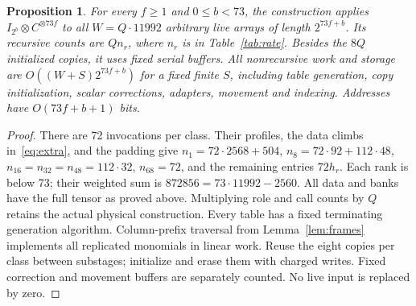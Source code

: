 \documentclass[11pt]{amsart}
\newtheorem{proposition}[theorem]{Proposition}
\theoremstyle{remark}
\begin{document}
\begin{proposition}\label{prop:global}
For every $f\ge1$ and $0\le b<73$, the construction applies
$I_{2^b}\otimes C^{\otimes73f}$ to all $W=Q\cdot11992$ arbitrary
live arrays of length $2^{73f+b}$. Its recursive counts are $Qn_r$,
where $n_r$ is in Table~\ref{tab:rate}. Besides the $8Q$ initialized
copies, it uses fixed serial buffers. All nonrecursive work and
storage are $O((W+S)2^{73f+b})$ for a fixed finite $S$, including table
generation, copy initialization, scalar corrections, adapters, movement
and indexing. Addresses have $O(73f+b+1)$ bits.
\end{proposition}
\begin{proof}
There are 72 invocations per class. Their profiles, the data climbs
in~\eqref{eq:extra}, and the padding give
$n_1=72\cdot2568+504$, $n_8=72\cdot92+112\cdot48$,
$n_{16}=n_{32}=n_{48}=112\cdot32$, $n_{68}=72$, and the remaining
entries $72h_r$. Each rank is below 73; their weighted sum is
$872856=73\cdot11992-2560$. All data and banks have the full tensor
as proved above. Multiplying role and call counts by $Q$ retains the
actual physical construction. Every table has a fixed terminating
generation algorithm. Column-prefix traversal from
Lemma~\ref{lem:frames} implements all replicated monomials in linear
work. Reuse the eight copies per class between substages; initialize
and erase them with charged writes. Fixed correction and movement
buffers are separately counted. No live input is replaced by zero.
\end{proof}
\end{document}
